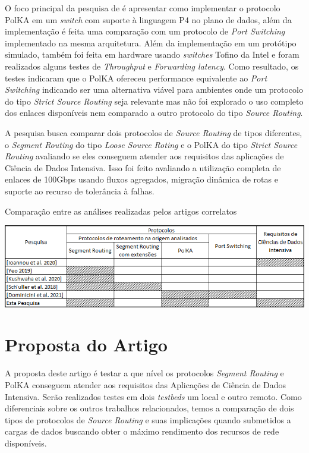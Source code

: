 \documentclass[12pt]{article}
\begin{document}
O foco principal da pesquisa de \cite{dominicini2021deploying} é apresentar como implementar o protocolo PolKA em um \textit{switch} com suporte à linguagem P4 no plano de dados, além da implementação é feita uma comparação com um protocolo de \textit{Port Switching} implementado na mesma arquitetura. Além da implementação em um protótipo simulado, também foi feita em hardware usando \textit{switches} Tofino da Intel e foram realizados alguns testes de \textit{Throughput} e \textit{Forwarding latency}. Como resultado, os testes indicaram que o PolKA ofereceu performance equivalente ao \textit{Port Switching} indicando ser uma alternativa viável para ambientes onde um protocolo do tipo \textit{Strict Source Routing} seja relevante mas não foi explorado o uso completo dos enlaces disponíveis nem comparado a outro protocolo do tipo \textit{Source Routing}.

A pesquisa busca comparar dois protocolos de \textit{Source Routing} de tipos diferentes, o \textit{Segment Routing} do tipo \textit{Loose Source Roting} e o PolKA do tipo \textit{Strict Source Routing} avaliando se eles conseguem atender aos requisitos das aplicações de Ciência de Dados Intensiva. Isso foi feito avaliando a utilização completa de enlaces de 100Gbps usando fluxos agregados, migração dinâmica de rotas e suporte ao recurso de tolerância à falhas.

\begin{table}[ht]
\centering
\caption{Comparação entre as análises realizadas pelos artigos correlatos}
\label{tab:Tabela1}
\includegraphics[width=.7\textwidth]{tabela1.png}
\end{table}

\section{Proposta do Artigo}

A proposta deste artigo é testar a que nível os protocolos \textit{Segment Routing} e PolKA conseguem atender aos requisitos das Aplicações de Ciência de Dados Intensiva. Serão realizados testes em dois \textit{testbeds} um local e outro remoto. Como diferenciais sobre os outros trabalhos relacionados, temos a comparação de dois tipos de protocolos de \textit{Source Routing} e suas implicações quando submetidos a cargas de dados buscando obter o máximo rendimento dos recursos de rede disponíveis.
\end{document}
